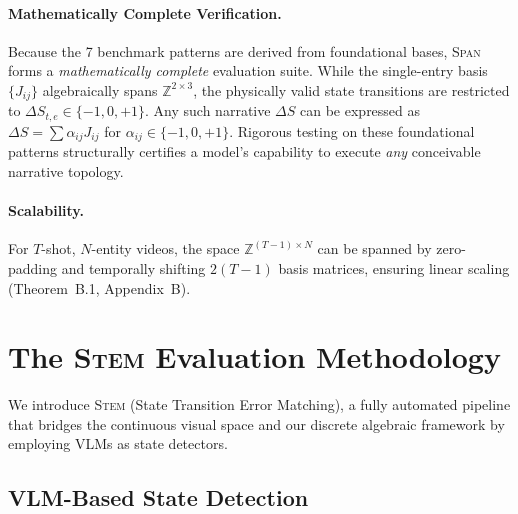 \documentclass[sigconf,review,anonymous]{acmart}
\theoremstyle{definition}
\newcommand{\diagonal}{\textsc{Span}}
\newcommand{\stem}{\textsc{Stem}}
\begin{document}
\paragraph{Mathematically Complete Verification.}
Because the 7 benchmark patterns are derived from foundational bases, \diagonal{} forms a \emph{mathematically complete} evaluation suite. While the single-entry basis $\{J_{ij}\}$ algebraically spans $\mathbb{Z}^{2 \times 3}$, the physically valid state transitions are restricted to $\Delta S_{t,e} \in \{-1, 0, +1\}$. Any such narrative $\Delta S$ can be expressed as $\Delta S = \sum \alpha_{ij} J_{ij}$ for $\alpha_{ij} \in \{-1, 0, +1\}$. Rigorous testing on these foundational patterns structurally certifies a model's capability to execute \emph{any} conceivable narrative topology.

\paragraph{Scalability.}
For $T$-shot, $N$-entity videos, the space $\mathbb{Z}^{(T-1) \times N}$ can be spanned by zero-padding and temporally shifting $2(T\!-\!1)$ basis matrices, ensuring linear scaling (Theorem~B.1, Appendix~B).

\section{The \stem{} Evaluation Methodology}
\label{sec:stem}

We introduce \stem{} (State Transition Error Matching), a fully automated pipeline that bridges the continuous visual space and our discrete algebraic framework by employing VLMs as state detectors.

\subsection{VLM-Based State Detection}
\label{sec:vlm_instantiation}
\end{document}
